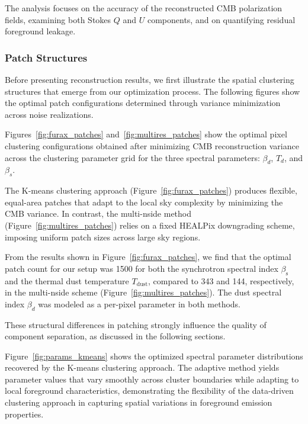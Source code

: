 \documentclass[fleqn,usenatbib]{mnras}
\begin{document}
The analysis focuses on the accuracy of the reconstructed CMB polarization fields, examining both Stokes \( Q \) and \( U \) components, and on quantifying residual foreground leakage.

\vspace{2mm}

\subsubsection*{Patch Structures}

Before presenting reconstruction results, we first illustrate the spatial clustering structures that emerge from our optimization process. The following figures show the optimal patch configurations determined through variance minimization across noise realizations.

Figures~\ref{fig:furax_patches} and~\ref{fig:multires_patches} show the optimal pixel clustering configurations obtained after minimizing CMB reconstruction variance across the clustering parameter grid for the three spectral parameters: \( \beta_d \), \( T_d \), and \( \beta_s \).

The K-means clustering approach (Figure~\ref{fig:furax_patches}) produces flexible, equal-area patches that adapt to the local sky complexity by minimizing the CMB variance. In contrast, the multi-nside method (Figure~\ref{fig:multires_patches}) relies on a fixed HEALPix downgrading scheme, imposing uniform patch sizes across large sky regions.

From the results shown in Figure~\ref{fig:furax_patches}, we find that the optimal patch count for our setup was 1500 for both the synchrotron spectral index \( \beta_{\mathrm{s}} \) and the thermal dust temperature \( T_{\mathrm{dust}} \), compared to 343 and 144, respectively, in the multi-nside scheme (Figure~\ref{fig:multires_patches}). The dust spectral index \( \beta_d \) was modeled as a per-pixel parameter in both methods.

These structural differences in patching strongly influence the quality of component separation, as discussed in the following sections.

Figure~\ref{fig:params_kmeans} shows the optimized spectral parameter distributions recovered by the K-means clustering approach. The adaptive method yields parameter values that vary smoothly across cluster boundaries while adapting to local foreground characteristics, demonstrating the flexibility of the data-driven clustering approach in capturing spatial variations in foreground emission properties.
\end{document}
